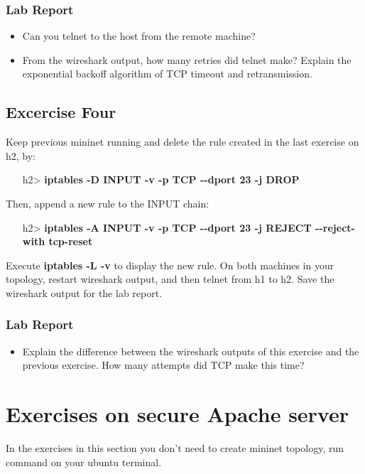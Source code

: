 \documentclass[10pt,a4paper]{article}
\numberwithin{equation}{section}
\numberwithin{figure}{section}
\numberwithin{table}{section}
\begin{document}
\subsubsection*{ Lab Report}
\begin{itemize}
	\setlength{\itemindent}{0pt}
	\item Can you telnet to the host from the remote machine?
	\item From the wireshark output, how many retries did telnet make? Explain the exponential backoff algorithm of TCP timeout and retransmission.
\end{itemize}

\subsection*{Excercise Four}
Keep previous mininet running and delete the rule created in the last exercise on h2, by:

\begin{itemize}
	\setlength{\itemindent}{10pt}
	\item [h2>] \textbf{iptables -D INPUT -v -p TCP {-}{-}dport 23 -j DROP} 
\end{itemize}

\setlength{\parindent}{0pt}
Then, append a new rule to the INPUT chain:

\begin{itemize}
	\setlength{\itemindent}{10pt}
	\item [h2>] \textbf{iptables -A INPUT -v -p TCP {-}{-}dport 23 -j REJECT {-}{-}reject-with tcp-reset} 
\end{itemize}

\setlength{\parindent}{0pt}
Execute \textbf{iptables -L -v} to display the new rule. On both machines in your topology, restart wireshark output, and then telnet from h1 to h2. Save the wireshark output for the lab report.

\subsubsection*{ Lab Report}
\begin{itemize}
	\setlength{\itemindent}{0pt}
	\item Explain the difference between the wireshark outputs of this exercise and the previous exercise. How many attempts did TCP make this time?
\end{itemize}

\pagebreak

\section{Exercises on secure Apache server}
In the exercises in this section you don't need to create mininet topology, run command on your ubuntu terminal.
\end{document}
